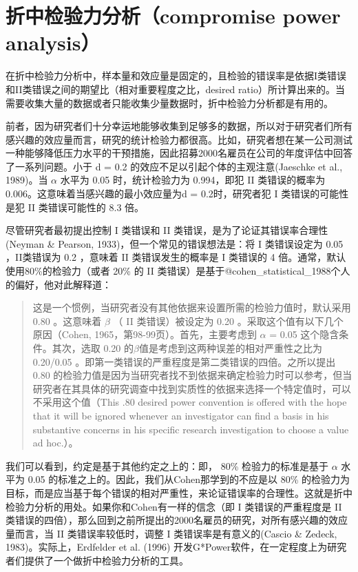 \documentclass[
  letterpaper,
  DIV=11,
  numbers=noendperiod]{scrreprt}
\begin{document}
\hypertarget{ux6298ux4e2dux68c0ux9a8cux529bux5206ux6790compromise-power-analysis}{%
\section{折中检验力分析（compromise power
analysis）}\label{ux6298ux4e2dux68c0ux9a8cux529bux5206ux6790compromise-power-analysis}}

在折中检验力分析中，样本量和效应量是固定的，且检验的错误率是依据I类错误和II类错误之间的期望比（相对重要程度之比，desired
ratio）所计算出来的。当需要收集大量的数据或者只能收集少量数据时，折中检验力分析都是有用的。

前者，因为研究者们十分幸运地能够收集到足够多的数据，所以对于研究者们所有感兴趣的效应量而言，研究的统计检验力都很高。比如，研究者想在某一公司测试一种能够降低压力水平的干预措施，因此招募2000名雇员在公司的年度评估中回答了一系列问题。小于
d = 0.2 的效应不足以引起个体的主观注意(Jaeschke et al., 1989)。当
\(\alpha\) 水平为 0.05 时，统计检验力为 0.994，即犯 II 类错误的概率为
0.006。这意味着当感兴趣的最小效应量为d = 0.2时，研究者犯 I
类错误的可能性是犯 II 类错误可能性的 8.3 倍。

尽管研究者最初提出控制 I 类错误和 II
类错误，是为了论证其错误率合理性(Neyman \& Pearson,
1933)，但一个常见的错误想法是：将 I 类错误设定为 0.05 ，II类错误为 0.2
，意味着 II 类错误发生的概率是 I 类错误的 4
倍。通常，默认使用80\%的检验力（或者 20\% 的 II
类错误）是基于@cohen\_statistical\_1988个人的偏好，他对此解释道：

\begin{quote}
这是一个惯例，当研究者没有其他依据来设置所需的检验力值时，默认采用 0.80
。这意味着 \(\beta\) （ II 类错误）被设定为 0.20
。采取这个值有以下几个原因（Cohen, 1965，第98-99页）。首先，主要考虑到
\(\alpha\) = 0.05 这个隐含条件。其次，选取 0.20
的\(\beta\)值是考虑到这两种误差的相对严重性之比为 0.20/0.05
。即第一类错误的严重程度是第二类错误的四倍。之所以提出 0.80
的检验力值是因为当研究者找不到依据来确定检验力时可以参考，但当研究者在其具体的研究调查中找到实质性的依据来选择一个特定值时，可以不采用这个值（This
.80 desired power convention is offered with the hope that it will be
ignored whenever an investigator can find a basis in his substantive
concerns in his specific research investigation to choose a value ad
hoc.）。
\end{quote}

我们可以看到，约定是基于其他约定之上的：即， 80\% 检验力的标准是基于
\(\alpha\) 水平为 0.05 的标准之上的。因此，我们从Cohen那学到的不应是以
80\%
的检验力为目标，而是应当基于每个错误的相对严重性，来论证错误率的合理性。这就是折中检验力分析的用处。如果你和Cohen有一样的信念（即
I 类错误的严重程度是 II
类错误的四倍），那么回到之前所提出的2000名雇员的研究，对所有感兴趣的效应量而言，当
II 类错误率较低时，调整 I 类错误率是有意义的(Cascio \& Zedeck,
1983)。实际上，Erdfelder et al. (1996)
开发G*Power软件，在一定程度上为研究者们提供了一个做折中检验力分析的工具。
\end{document}
